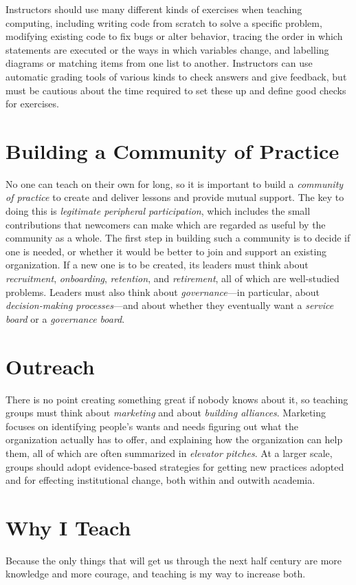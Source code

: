 \documentclass{article}
\begin{document}
Instructors should use many different kinds of exercises when teaching computing,
including writing code from scratch to solve a specific problem,
modifying existing code to fix bugs or alter behavior,
tracing the order in which statements are executed or the ways in which variables change,
and labelling diagrams or matching items from one list to another.
Instructors can use automatic grading tools of various kinds to check answers and give feedback,
but must be cautious about the time required to set these up and define good checks for exercises.

\section{Building a Community of Practice}

No one can teach on their own for long,
so it is important to build a \emph{community of practice}
to create and deliver lessons and provide mutual support.
The key to doing this is \emph{legitimate peripheral participation},
which includes the small contributions that newcomers can make
which are regarded as useful by the community as a whole.
The first step in building such a community is to decide if one is needed,
or whether it would be better to join and support an existing organization.
If a new one is to be created,
its leaders must think about \emph{recruitment}, \emph{onboarding}, \emph{retention}, and \emph{retirement},
all of which are well-studied problems.
Leaders must also think about \emph{governance}---in particular,
about \emph{decision-making processes}---and
about whether they eventually want a \emph{service board} or a \emph{governance board}.

\section{Outreach}

There is no point creating something great if nobody knows about it,
so teaching groups must think about \emph{marketing} and about \emph{building alliances}.
Marketing focuses on identifying people's wants and needs
figuring out what the organization actually has to offer,
and explaining how the organization can help them,
all of which are often summarized in \emph{elevator pitches}.
At a larger scale,
groups should adopt evidence-based strategies for getting new practices adopted
and for effecting institutional change,
both within and outwith academia.

\section{Why I Teach}

Because the only things that will get us through the next half century are more knowledge and more courage,
and teaching is my way to increase both.
\end{document}
